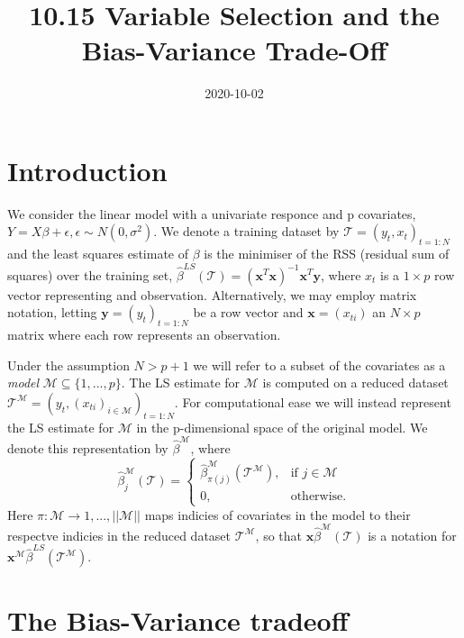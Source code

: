 \documentclass{article}
\title{10.15 Variable Selection and the Bias-Variance Trade-Off }
\date{2020-10-02}
\begin{document}
\maketitle

\section{Introduction}

We consider the linear model with a univariate responce and p covariates, $Y=X\beta + \epsilon, \epsilon \sim N(0,\sigma ^2)$. We denote a training dataset by $\mathcal{T}=(y_t,x_t)_{t=1:N}$ and the least squares estimate of $\beta$ is the minimiser of the RSS (residual sum of squares) over the training set, $\hat{\beta}^{LS}(\mathcal{T})=(\textbf{x}^T\textbf{x})^{-1}\textbf{x}^T\textbf{y}$, where $x_t$ is a $1 \times p$ row vector representing and observation. Alternatively, we may employ
matrix notation, letting $\textbf{y}=(y_t)_{t=1:N}$ be a row vector and $\textbf{x}=(x_{ti})$ an $N \times p$ matrix where each row represents an observation. 

Under the assumption $N>p+1$ we will refer to a subset of the covariates as a \textit{model} $\mathcal{M} \subseteq \{ 1,...,p \}$. The LS estimate for $\mathcal{M}$ is computed on a reduced dataset $\mathcal{T}^{\mathcal{M}}= (y_t,(x_{ti})_{i \in \mathcal{M}})_{t=1:N}$. For computational ease we will instead represent the LS estimate for $\mathcal{M}$ in the p-dimensional space of the original model. We denote this representation by $\hat{\beta}^{\mathcal{M}}$, where 
\begin{equation*}
\hat{\beta}^{\mathcal{M}}_j(\mathcal{T})=
\begin{cases}
\hat{\beta}^{\mathcal{M}}_{\pi(j)}(\mathcal{T}^{\mathcal{M}}), & \text{if } j \in \mathcal{M} \\
0, & \text{otherwise}.
\end{cases}
\end{equation*}
Here $\pi : \mathcal{M} \to {1,...,||\mathcal{M}||}$ maps indicies of covariates in the model to their respectve indicies in the reduced dataset $\mathcal{T}^{\mathcal{M}}$, so that $\textbf{x} \hat{\beta}^{\mathcal{M}}(\mathcal{T})$ is a notation for $\textbf{x}^{\mathcal{M}} \hat{\beta}^{LS} (\mathcal{T}^{\mathcal{M}})$.

\newpage

\section{The Bias-Variance tradeoff}
\vspace{-0.5cm}
\end{document}
